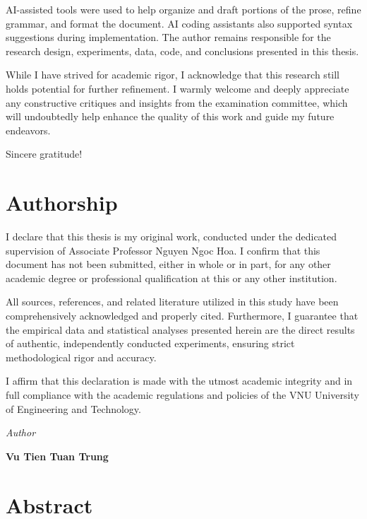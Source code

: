 \documentclass[12pt, a4paper, reqno, oneside]{book}
\begin{document}
AI-assisted tools were used to help organize and draft portions of the prose, refine grammar, and format the document. AI coding assistants also supported syntax suggestions during implementation. The author remains responsible for the research design, experiments, data, code, and conclusions presented in this thesis.

While I have strived for academic rigor, I acknowledge that this research still holds potential for further refinement. I warmly welcome and deeply appreciate any constructive critiques and insights from the examination committee, which will undoubtedly help enhance the quality of this work and guide my future endeavors.

Sincere gratitude!


\newpage
\chapter*{Authorship}
\vspace{20pt}

I declare that this thesis is my original work, conducted under the dedicated supervision of Associate Professor Nguyen Ngoc Hoa. I confirm that this document has not been submitted, either in whole or in part, for any other academic degree or professional qualification at this or any other institution.

All sources, references, and related literature utilized in this study have been comprehensively acknowledged and properly cited. Furthermore, I guarantee that the empirical data and statistical analyses presented herein are the direct results of authentic, independently conducted experiments, ensuring strict methodological rigor and accuracy.

I affirm that this declaration is made with the utmost academic integrity and in full compliance with the academic regulations and policies of the VNU University of Engineering and Technology.

\begin{flushright}
{\it Author}
\hskip 1.5cm\quad


\vskip 2cm
{\bf Vu Tien Tuan Trung }  \quad\ \quad
\end{flushright}
\newpage



\newpage
\chapter*{Abstract}
\vspace{20pt}
\end{document}
